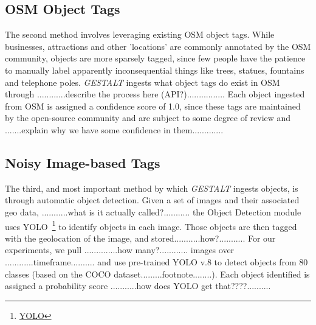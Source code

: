 
\subsection{OSM Object Tags}
The second method involves leveraging existing OSM object tags.
While businesses, attractions and other 'locations' are commonly annotated by the OSM community, objects are more sparsely tagged, since few people have the patience to manually label apparently inconsequential things like trees, statues, fountains and telephone poles. 
\emph{GESTALT} ingests what object tags do exist in OSM through 
............describe the process here (API?)................
Each object ingested from OSM is assigned a confidence score of 1.0, since these tags are maintained by the open-source community and are subject to some degree of review and .......explain why we have some confidence in them.............


\subsection{Noisy Image-based Tags}
The third, and most important method by which \emph{GESTALT} ingests objects, is through automatic object detection.
Given a set of images and their associated geo data, ...........what is it actually called?........... the Object Detection module uses YOLO~\footnote{\href{https://github.com/ultralytics/ultralytics}{YOLO}} to identify objects in each image. Those objects are then tagged with the geolocation of the image, and stored...........how?........... For our experiments, we pull ..............how many?............ images over ............timeframe.......... and use pre-trained YOLO v.8 to detect objects from 80 classes (based on the COCO dataset.........footnote........). Each object identified is assigned a probability score ...........how does YOLO get that????..........





